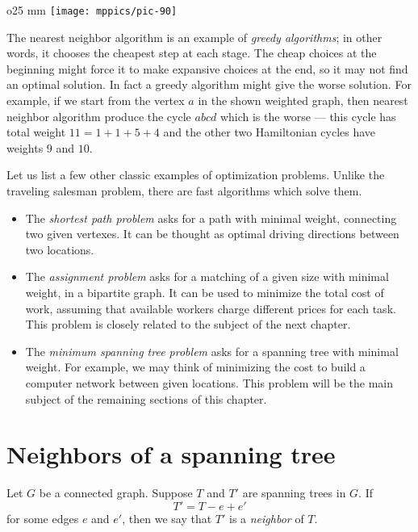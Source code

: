 \begin{wrapfigure}{o}{25 mm}
\vskip-0mm
\centering
\texttt{[image: mppics/pic-90]}
\end{wrapfigure}

The nearest neighbor algorithm is an example of \emph{greedy algorithms};
in other words, it chooses the cheapest step at each stage.
The cheap choices at the beginning might force it to make expansive choices at the end,
so it may not find an optimal solution. 
In fact a greedy algorithm might give the worse solution.
For example, if we start from the vertex $a$ in the shown weighted graph, then nearest neighbor algorithm produce the cycle $abcd$ which is the worse --- this cycle has total weight $11=1+1+5+4$ and the other two  Hamiltonian cycles have weights $9$ and $10$.

Let us list a few other classic examples of optimization problems.
Unlike the traveling salesman problem, there are fast algorithms which solve them.
\begin{itemize}
\item The \emph{shortest path problem} asks for a path with minimal weight, connecting two given vertexes.
It can be thought as optimal driving directions between two locations.
\item The \label{assignment problem}\emph{assignment problem} asks for a matching of a given size with minimal weight, in a bipartite graph.
It can be used to minimize the total cost of work, assuming that available workers charge different prices for each task.
This problem is closely related to the subject of the next chapter.
\item The \emph{minimum spanning tree problem} asks for a spanning tree with minimal weight.
For example, we may think of minimizing the cost to build a computer network between given locations.
This problem will be the main subject of the remaining sections of this chapter.
\end{itemize}


\section*{Neighbors of a spanning tree}

Let $G$ be a connected graph.
Suppose $T$ and $T'$ are spanning trees in $G$.
If 
\[T'=T-e+e'\]
for some edges $e$ and $e'$,
then we say that $T'$ is a \emph{neighbor} of $T$.

